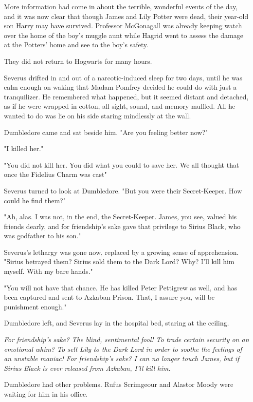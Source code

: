 More information had come in about the terrible, wonderful events of the day, and it was now clear that though James and Lily Potter were dead, their year-old son Harry may have survived. Professor McGonagall was already keeping watch over the home of the boy's muggle aunt while Hagrid went to assess the damage at the Potters' home and see to the boy's safety.

They did not return to Hogwarts for many hours.

Severus drifted in and out of a narcotic-induced sleep for two days, until he was calm enough on waking that Madam Pomfrey decided he could do with just a tranquilizer. He remembered what happened, but it seemed distant and detached, as if he were wrapped in cotton, all sight, sound, and memory muffled. All he wanted to do was lie on his side staring mindlessly at the wall.

Dumbledore came and sat beside him. "Are you feeling better now?"

"I killed her."

"You did not kill her. You did what you could to save her. We all thought that once the Fidelius Charm was cast{\el}"

Severus turned to look at Dumbledore. "But you were their Secret-Keeper. How could he find them?"

"Ah, alas. I was not, in the end, the Secret-Keeper. James, you see, valued his friends dearly, and for friendship's sake gave that privilege to Sirius Black, who was godfather to his son."

Severus's lethargy was gone now, replaced by a growing sense of apprehension. "Sirius betrayed them? Sirius sold them to the Dark Lord? Why? I'll kill him myself. With my bare hands."

"You will not have that chance. He has killed Peter Pettigrew as well, and has been captured and sent to Azkaban Prison. That, I assure you, will be punishment enough."

Dumbledore left, and Severus lay in the hospital bed, staring at the ceiling.

\emph{For friendship's sake? The blind, sentimental fool! To trade certain security on an emotional whim? To sell Lily to the Dark Lord in order to soothe the feelings of an unstable maniac! For friendship's sake? I can no longer touch James, but if Sirius Black is ever released from Azkaban, I'll kill him.}

Dumbledore had other problems. Rufus Scrimgeour and Alastor Moody were waiting for him in his office.

